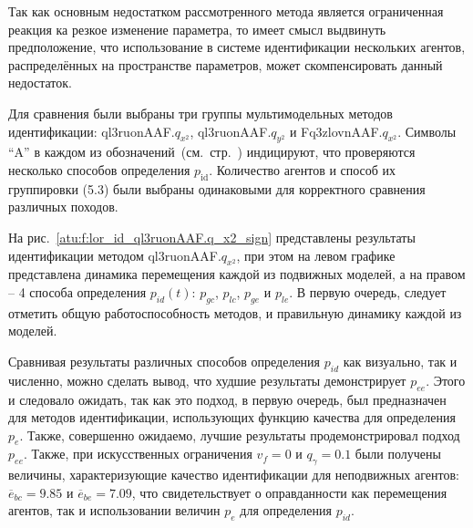 Так как основным недостатком рассмотренного метода является
ограниченная реакция ка резкое изменение параметра,
то имеет смысл выдвинуть предположение,
что использование в системе идентификации нескольких агентов,
распределённых на пространстве параметров, может
скомпенсировать данный недостаток.


Для сравнения были выбраны три группы мультимодельных методов идентификации:
ql3ruonAAF.$q_{x^2}$,
ql3ruonAAF.$q_{y^2}$ и
Fq3zlovnAAF.$q_{x^2}$. Символы ``A'' в каждом из
обозначений~(см.~стр.~\pageref{atu:id_classification})
индицируют, что проверяются
несколько способов определения $p_\mathrm{id}$.
Количество агентов и способ их группировки (5.3) были выбраны
одинаковыми для корректного сравнения различных походов.


На рис.~\ref{atu:f:lor_id_ql3ruonAAF.q_x2_sign} представлены результаты идентификации
методом ql3ruonAAF.$q_{x^2}$, при этом на левом графике представлена
динамика перемещения каждой из подвижных моделей,
а на правом -- 4 способа определения $p_{id}(t)$:
$p_{gc}$, $p_{lc}$, $p_{ge}$ и $p_{le}$.
В первую очередь, следует отметить общую работоспособность
методов, и правильную динамику каждой из моделей.


Сравнивая результаты различных способов определения
$p_{id}$ как визуально, так и численно, можно сделать
вывод, что худшие результаты демонстрирует $p_{ee}$.
Этого и следовало ожидать, так как это подход, в первую очередь,
был предназначен для методов идентификации, использующих
функцию качества для определения $p_e$.
Также, совершенно ожидаемо, лучшие результаты продемонстрировал
подход $p_{ee}$. Также, при искусственных ограничения
$v_f=0$ и $q_\gamma=0.1$ были получены величины,
характеризующие качество идентификации для неподвижных агентов:
$\overline{e}_{bc}=9.85$
и
$\overline{e}_{be}=7.09$, что свидетельствует
о оправданности как перемещения агентов,
так и использовании величин $p_e$ для определения $p_{id}$.



